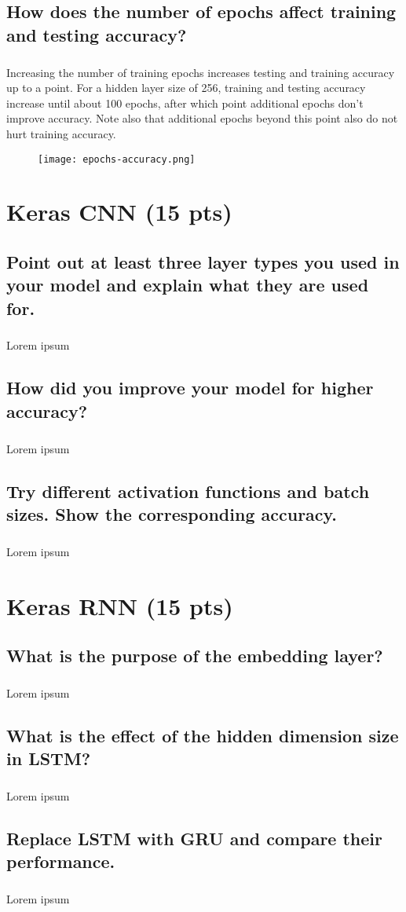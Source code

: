 \documentclass[11pt]{article}
\begin{document}
\subsection{How does the number of epochs affect training and testing accuracy?}

\subparagraph{}

Increasing the number of training epochs increases testing and training accuracy up to a point. For a hidden layer size of 256, training and testing accuracy increase until about 100 epochs, after which point additional epochs don't improve accuracy. Note also that additional epochs beyond this point also do not hurt training accuracy.

\begin{figure}[h]
	\texttt{[image: epochs-accuracy.png]}
	\label{fig:graph}
\end{figure}

\section{Keras CNN (15 pts)}

\subsection{Point out at least three layer types you used in your model and explain what they are used for.}

\subparagraph{}

Lorem ipsum

\subsection{How did you improve your model for higher accuracy?}

\subparagraph{}

Lorem ipsum

\subsection{Try different activation functions and batch sizes. Show the corresponding accuracy.}

\subparagraph{}

Lorem ipsum

\section{Keras RNN (15 pts)}

\subsection{What is the purpose of the embedding layer?}

\subparagraph{}

Lorem ipsum

\subsection{What is the effect of the hidden dimension size in LSTM?}

\subparagraph{}

Lorem ipsum

\subsection{Replace LSTM with GRU and compare their performance.}

\subparagraph{}

Lorem ipsum
\end{document}
